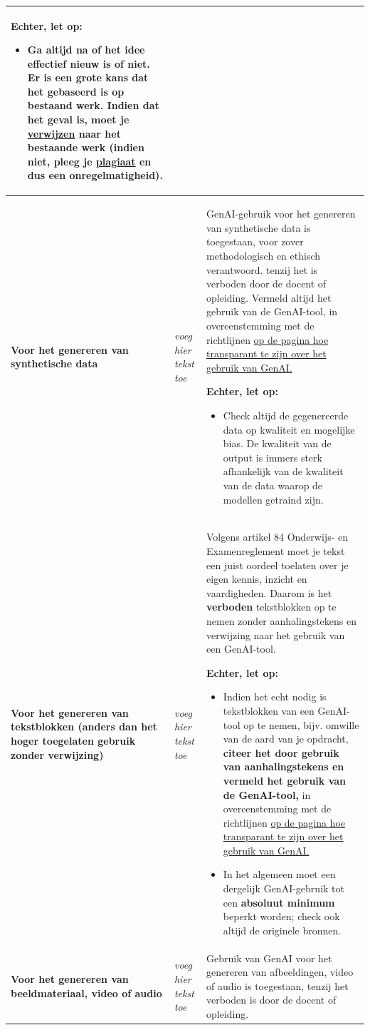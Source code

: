 \begin{longtable}{|p{}|p{}|p{}|}
\medskip
\textbf{Echter, let op:}
\begin{itemize}
    \item Ga altijd na of het idee effectief nieuw is of niet. Er is een grote kans dat het gebaseerd is op bestaand werk. Indien dat het geval is, \textbf{moet} je \href{https://bib.kuleuven.be/training-en-tutorials/citeren/basisprincipes}{verwijzen} naar het \textbf{bestaande werk }(indien niet, pleeg je \href{https://www.kuleuven.be/onderwijs/plagiaat/index}{plagiaat} en dus een onregelmatigheid).
\end{itemize}\\ \hline
\textbf{Voor het genereren van synthetische data } & \textit{voeg hier tekst toe} & GenAI-gebruik voor het genereren van synthetische data is toegestaan, voor zover methodologisch en ethisch verantwoord. tenzij het is verboden door de docent of opleiding. Vermeld altijd het gebruik van de GenAI-tool, in overeenstemming met de richtlijnen \href{https://www.kuleuven.be/onderwijs/student/onderwijstools/artificiele-intelligentie#Transparantie}{op de pagina hoe transparant te zijn over het gebruik van GenAI.}

\medskip
\textbf{Echter, let op:}
\begin{itemize}
    \item Check altijd de gegenereerde data op kwaliteit en mogelijke bias. De kwaliteit van de output is immers sterk afhankelijk van de kwaliteit van de data waarop de modellen getraind zijn.
\end{itemize} \\ \hline
\textbf{Voor het genereren van tekstblokken (anders dan het hoger toegelaten gebruik zonder verwijzing)} & \textit{voeg hier tekst toe} & Volgens artikel 84 Onderwijs- en Examenreglement moet je tekst een juist oordeel toelaten over je eigen kennis, inzicht en vaardigheden. Daarom is het \textbf{verboden} tekstblokken op te nemen zonder aanhalingstekens en verwijzing naar het gebruik van een GenAI-tool.

\medskip
\textbf{Echter, let op:}
\begin{itemize}
    \item Indien het echt nodig is tekstblokken van een GenAI-tool op te nemen, bijv. omwille van de aard van je opdracht, \textbf{citeer het door gebruik van aanhalingstekens en vermeld het gebruik van de GenAI-tool,} in overeenstemming met de richtlijnen \href{https://www.kuleuven.be/onderwijs/student/onderwijstools/artificiele-intelligentie#Transparantie}{op de pagina hoe transparant te zijn over het gebruik van GenAI.}
    \item In het algemeen moet een dergelijk GenAI-gebruik tot een \textbf{absoluut minimum} beperkt worden; check ook altijd de originele bronnen.
\end{itemize} \\ \hline
\textbf{Voor het genereren van beeldmateriaal, video of audio} & \textit{voeg hier tekst toe} & Gebruik van GenAI voor het genereren van afbeeldingen, video of audio is toegestaan, tenzij het verboden is door de docent of opleiding. 


\end{longtable}
